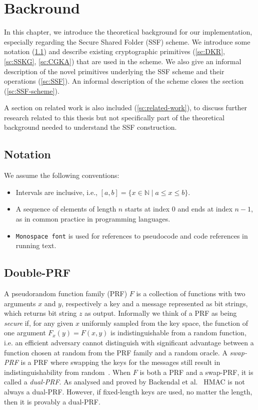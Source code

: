 \chapter{Backround}\label{ch:background}

In this chapter, we introduce the theoretical
background for our implementation, especially regarding the Secure Shared Folder 
(SSF) scheme. We introduce some notation (\cref{sc:notation}) and
describe existing cryptographic primitives (\cref{sc:DKR}, \cref{sc:SSKG}, \cref{sc:CGKA})
that are used in the scheme.
We also give an informal description of the novel primitives 
underlying the SSF scheme and their operations (\cref{sc:SSF}).
An informal description of the scheme closes the section (\cref{sc:SSF-scheme}).

A section on related work is also included (\cref{sc:related-work}),
to discuss further research related to this thesis but not specifically 
part of the theoretical background needed to understand the SSF construction.

\section{Notation}\label{sc:notation}

We assume the following conventions:
\begin{itemize}
    \item Intervals are inclusive, i.e., $[a, b] = \{x \in \mathbb{N} \mid a \leq x \leq b\}$.
    \item A sequence of elements of length $n$ starts at index $0$ and ends at index $n-1$, as in common practice in programming languages.
    \item \texttt{Monospace font} is used for references to pseudocode and code references in running text.
\end{itemize}

\section{Double-PRF}\label{sc:DPRF}

A pseudorandom function family (PRF) $F$ is a collection of functions
with two arguments $x$ and $y$, respectively a key and a message
represented as bit strings, which returns bit string $z$ as output.
Informally we think of a PRF as being \textit{secure} if, for any given $x$
uniformly sampled from the key space, the function of one argument
$F_x(y) = F(x, y)$ is indistinguishable from a random function, i.e.
an efficient adversary cannot distinguish with significant advantage
between a function chosen at random from the PRF family and a random oracle.
A \textit{swap-PRF} is a PRF where swapping the keys for the messages
still result in indistinguishability from random~\cite{EPRINT:BelLys15}.
When $F$ is both a PRF and a swap-PRF, it is called a \textit{dual-PRF}.
As analysed and proved by Backendal et al.~\cite{C:BBGS23} HMAC is not always a
dual-PRF. However, if fixed-length keys are used, no matter the length,
then it is provably a dual-PRF.

